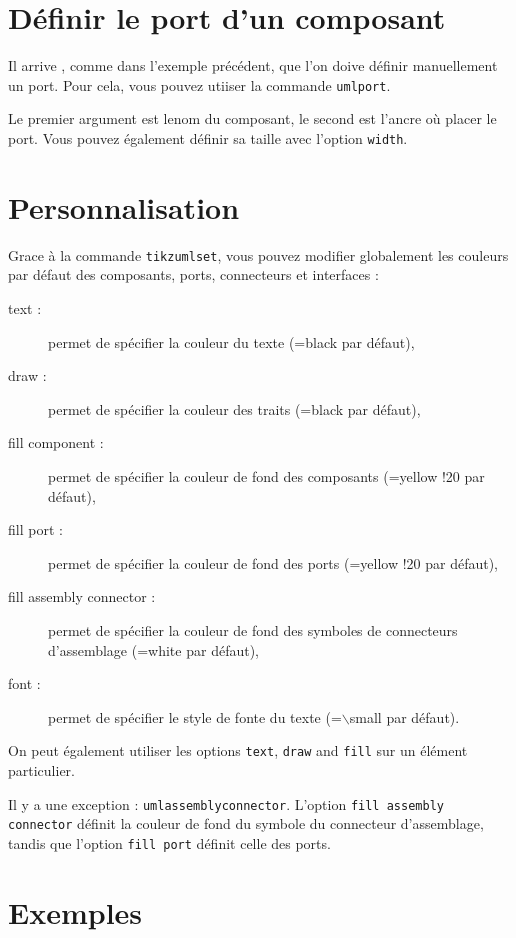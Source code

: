 \documentclass[a4paper,11pt]{report}
\begin{document}
\medskip

\section{Définir le port d'un composant}

Il arrive , comme dans l'exemple précédent, que l'on doive définir manuellement un port. Pour cela, vous pouvez utiiser la commande {\tt umlport}.

Le premier argument est lenom du composant, le second est l'ancre où placer le port. Vous pouvez également définir sa taille avec l'option {\tt width}.

\section{Personnalisation}

Grace à la commande {\tt tikzumlset}, vous pouvez modifier globalement les couleurs par défaut des composants, ports, connecteurs et interfaces :

\begin{description}
\item[text :] permet de spécifier la couleur du texte (=black par défaut),
\item[draw :] permet de spécifier la couleur des traits (=black par défaut),
\item[fill component :] permet de spécifier la couleur de fond des composants (=yellow !20 par défaut),
\item[fill port :] permet de spécifier la couleur de fond des ports (=yellow !20 par défaut),
\item[fill assembly connector :] permet de spécifier la couleur de fond des symboles de connecteurs d'assemblage (=white par défaut),
\item[font :] permet de spécifier le style de fonte du texte (=$\backslash$small par défaut).
\end{description}

On peut également utiliser les options {\tt text}, {\tt draw} and {\tt fill} sur un élément particulier.

Il y a une exception : {\tt umlassemblyconnector}. L'option {\tt fill assembly connector} définit la couleur de fond du symbole du connecteur d'assemblage, tandis que l'option {\tt fill port} définit celle des ports.

\section{Exemples}
\end{document}
